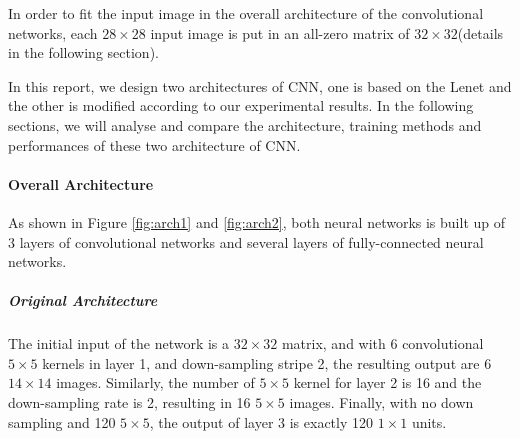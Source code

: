 \documentclass[12pt]{article}
\begin{document}
In order to fit the input image in the overall architecture of the convolutional networks, each $28\times 28$ input image is put in an all-zero matrix of $32\times 32$(details in the following section).

In this report, we design two architectures of CNN, one is based on the Lenet \cite{lecun1998gradient} and the other is modified according to our experimental results. In the following sections, we will analyse and compare the architecture, training methods and performances of these two architecture of CNN.

\paragraph{Overall Architecture}

As shown in Figure \ref{fig:arch1} and \ref{fig:arch2}, both neural networks is built up of 3 layers of convolutional networks and several layers of fully-connected neural networks.

\subparagraph {Original Architecture}

The initial input of the network is a $32\times 32$ matrix, and with 6 convolutional $5\times 5$ kernels in layer 1, and down-sampling stripe 2, the resulting output are 6 $14\times 14$ images. Similarly, the number of $5\times 5$ kernel for layer 2 is 16 and the down-sampling rate is 2, resulting in 16 $5\times 5$ images. Finally, with no down sampling and 120 $5\times 5$, the output of layer 3 is exactly 120 $1\times 1$ units.
\end{document}

